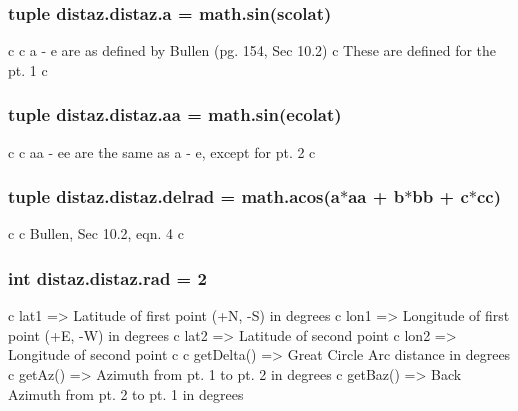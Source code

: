 \subsubsection[{a}]{\setlength{\rightskip}{0pt plus 5cm}tuple distaz.\+distaz.\+a = math.\+sin(scolat)\hspace{0.3cm}{\ttfamily [static]}}\label{classdistaz_1_1distaz_adb0db47f4fc7ad23fe6b38ef41ede80d}
\begin{DoxyVerb}    c
    c  a - e are as defined by Bullen (pg. 154, Sec 10.2)
    c     These are defined for the pt. 1
    c
\end{DoxyVerb}
 \hypertarget{classdistaz_1_1distaz_ab2242c591dc865b7ea4a11881877de95}{}
\subsubsection[{aa}]{\setlength{\rightskip}{0pt plus 5cm}tuple distaz.\+distaz.\+aa = math.\+sin(ecolat)\hspace{0.3cm}{\ttfamily [static]}}\label{classdistaz_1_1distaz_ab2242c591dc865b7ea4a11881877de95}
\begin{DoxyVerb}    c
    c  aa - ee are the same as a - e, except for pt. 2
    c
\end{DoxyVerb}
 \hypertarget{classdistaz_1_1distaz_a0cfb3cd9491e2c479e6c52516a2fee82}{}
\subsubsection[{delrad}]{\setlength{\rightskip}{0pt plus 5cm}tuple distaz.\+distaz.\+delrad = math.\+acos({\bf a}$\ast${\bf aa} + b$\ast$bb + c$\ast$cc)\hspace{0.3cm}{\ttfamily [static]}}\label{classdistaz_1_1distaz_a0cfb3cd9491e2c479e6c52516a2fee82}
\begin{DoxyVerb}    c
    c  Bullen, Sec 10.2, eqn. 4
    c
\end{DoxyVerb}
 \hypertarget{classdistaz_1_1distaz_ae75c2ff534e098418237addb7d243b15}{}
\subsubsection[{rad}]{\setlength{\rightskip}{0pt plus 5cm}int distaz.\+distaz.\+rad = 2\hspace{0.3cm}{\ttfamily [static]}}\label{classdistaz_1_1distaz_ae75c2ff534e098418237addb7d243b15}
\begin{DoxyVerb}c lat1 => Latitude of first point (+N, -S) in degrees
c lon1 => Longitude of first point (+E, -W) in degrees
c lat2 => Latitude of second point
c lon2 => Longitude of second point
c
c getDelta() => Great Circle Arc distance in degrees
c getAz()    => Azimuth from pt. 1 to pt. 2 in degrees
c getBaz()   => Back Azimuth from pt. 2 to pt. 1 in degrees
\end{DoxyVerb}
 \hypertarget{classdistaz_1_1distaz_a2a9ed83eb1131cefa14085e0b84e6486}{}
